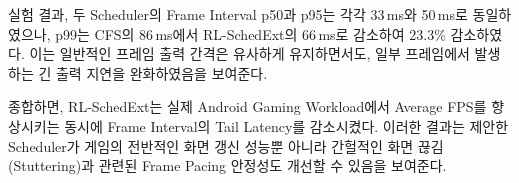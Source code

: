 실험 결과, 두 Scheduler의 Frame Interval p50과 p95는 각각 33\,ms와 50\,ms로 동일하였으나, p99는 CFS의 86\,ms에서 RL-SchedExt의 66\,ms로 감소하여 23.3\% 감소하였다. 이는 일반적인 프레임 출력 간격은 유사하게 유지하면서도, 일부 프레임에서 발생하는 긴 출력 지연을 완화하였음을 보여준다.

종합하면, RL-SchedExt는 실제 Android Gaming Workload에서 Average FPS를 향상시키는 동시에 Frame Interval의 Tail Latency를 감소시켰다. 이러한 결과는 제안한 Scheduler가 게임의 전반적인 화면 갱신 성능뿐 아니라 간헐적인 화면 끊김(Stuttering)과 관련된 Frame Pacing 안정성도 개선할 수 있음을 보여준다.
